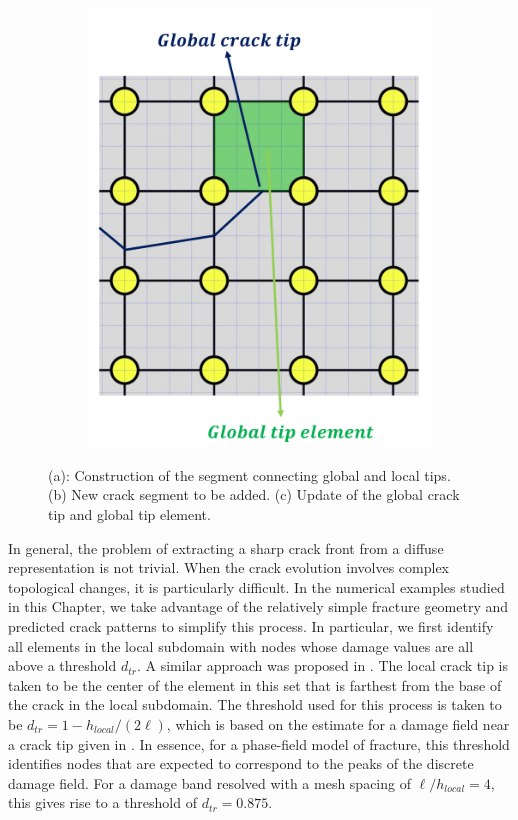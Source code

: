 \begin{figure}
\begin{subfigure}{.33\textwidth}
  \includegraphics[width=\linewidth]{img/Section2/schematic_3.png}
  \caption{}
  \label{fig:prop_3}
\end{subfigure}
\caption{(a): Construction of the segment connecting global and local tips.  (b) New crack segment to be added. (c) Update of the global crack tip and global tip element.}
  \label{fig:tip_progression}
\end{figure}

In general, the problem of extracting a sharp crack front from a diffuse representation is not trivial. When the crack evolution involves complex topological changes, it is particularly difficult\cite{tamayo2015medial}. In the numerical examples studied in this Chapter, we take advantage of the relatively simple fracture geometry and predicted crack patterns to simplify this process.  In particular, we first identify all elements in the local subdomain with nodes whose damage values are all above a threshold $d_{tr}$. A similar approach was proposed in \cite{giovanardi2017hybrid}. The local crack tip is taken to be the center of the element in this set that is farthest from the base of the crack in the local subdomain.  The threshold used for this process is taken to be $d_{tr} = 1 - h_{local}/(2\ell)$, which is based on the estimate for a damage field near a crack tip given in \cite{yoshioka2020crack}. In essence, for a phase-field model of fracture, this threshold identifies nodes that are expected to correspond to the peaks of the discrete damage field.  For a damage band resolved with a mesh spacing of $\ell / h_{local} = 4$, this gives rise to a threshold of  $d_{tr} = 0.875$. 

